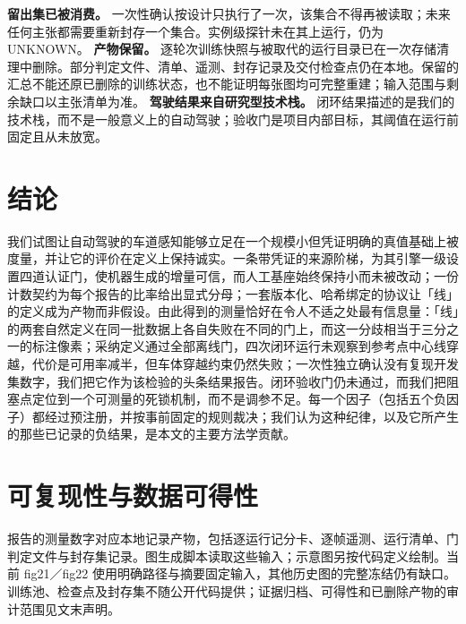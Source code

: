 \documentclass[journal]{IEEEtran}
\begin{document}
\textbf{留出集已被消费。} 一次性确认按设计只执行了一次，该集合不得再被读取；未来任何主张都需要重新封存一个集合。实例级探针未在其上运行，仍为 UNKNOWN。
\textbf{产物保留。} 逐轮次训练快照与被取代的运行目录已在一次存储清理中删除。部分判定文件、清单、遥测、封存记录及交付检查点仍在本地。保留的汇总不能还原已删除的训练状态，也不能证明每张图均可完整重建；输入范围与剩余缺口以主张清单为准。
\textbf{驾驶结果来自研究型技术栈。} 闭环结果描述的是我们的技术栈，而不是一般意义上的自动驾驶；验收门是项目内部目标，其阈值在运行前固定且从未放宽。
\section{结论}
我们试图让自动驾驶的车道感知能够立足在一个规模小但凭证明确的真值基础上被度量，并让它的评价在定义上保持诚实。一条带凭证的来源阶梯，为其引擎一级设置四道认证门，使机器生成的增量可信，而人工基座始终保持小而未被改动；一份计数契约为每个报告的比率给出显式分母；一套版本化、哈希绑定的协议让「线」的定义成为产物而非假设。由此得到的测量恰好在令人不适之处最有信息量：「线」的两套自然定义在同一批数据上各自失败在不同的门上，而这一分歧相当于三分之一的标注像素；采纳定义通过全部离线门，四次闭环运行未观察到参考点中心线穿越，代价是可用率减半，但车体穿越约束仍然失败；一次性独立确认没有复现开发集数字，我们把它作为该检验的头条结果报告。闭环验收门仍未通过，而我们把阻塞点定位到一个可测量的死锁机制，而不是调参不足。每一个因子（包括五个负因子）都经过预注册，并按事前固定的规则裁决；我们认为这种纪律，以及它所产生的那些已记录的负结果，是本文的主要方法学贡献。
\section*{可复现性与数据可得性}
报告的测量数字对应本地记录产物，包括逐运行记分卡、逐帧遥测、运行清单、门判定文件与封存集记录。图生成脚本读取这些输入；示意图另按代码定义绘制。当前 fig21／fig22 使用明确路径与摘要固定输入，其他历史图的完整冻结仍有缺口。训练池、检查点及封存集不随公开代码提供；证据归档、可得性和已删除产物的审计范围见文末声明。
\end{document}
